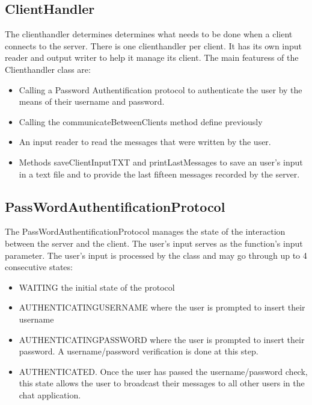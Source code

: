 \documentclass[11pt,letterpaper]{article}
\begin{document}
\subsection{ClientHandler}
The clienthandler determines determines what needs to be done when a client connects to the server. There is one clienthandler per client. It has its own input reader and output writer to help it manage its client. The main featuress of the Clienthandler class are:
\begin{itemize}
  \item Calling a Password Authentification protocol to authenticate the user by the means of their username and password.
  \item Calling the communicateBetweenClients method define previously
  \item An input reader to read the messages that were written by the user.
  \item Methods saveClientInputTXT and printLastMessages to save an user's input in a text file and to provide the last fifteen messages recorded by the server.
\end{itemize}

\subsection{PassWordAuthentificationProtocol}
The PassWordAuthentificationProtocol manages the state of the interaction between the server and the client. The user's input serves as the function's input parameter. The user's input is processed by the class and may go through up to 4 consecutive states:

\begin{itemize}
  \item WAITING the initial state of the protocol
  \item AUTHENTICATINGUSERNAME  where the user is prompted to insert their username
  \item AUTHENTICATINGPASSWORD where the user is prompted to insert their password. A username/password verification is done at this step. 
  \item AUTHENTICATED. Once the user has passed the username/password check, this state allows the user to broadcast their messages to all other users in the chat application.
\end{itemize}

\medskip

\end{document}
